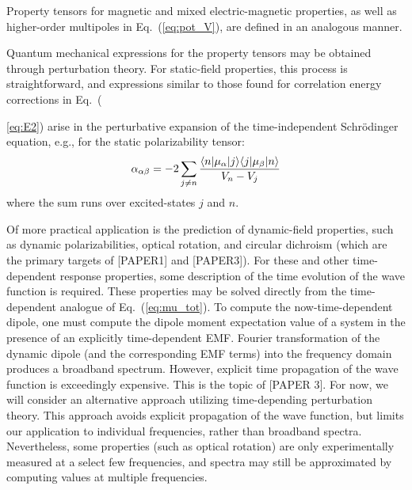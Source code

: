 Property tensors for magnetic and mixed electric-magnetic properties, as well as higher-order
multipoles in Eq.~(\ref{eq:pot_V}), are defined in an 
analogous manner.\cite{Barron2004} 

Quantum mechanical expressions for the property tensors may be obtained through perturbation theory. 
For static-field properties, this process is straightforward, and expressions similar to those found for
correlation energy corrections in Eq.~({\ref{eq:E2}) arise in the perturbative expansion of the time-independent Schr\"odinger
equation, e.g., for the static polarizability tensor:
\begin{equation} \label{eq:static_pol}
\alpha_{\alpha\beta} = -2\sum_{j\neq n}\frac{\langle n |\mu_\alpha| j \rangle\langle j |\mu_\beta| n \rangle}{V_n - V_j} 
\end{equation}
where the sum runs over excited-states $j$ and $n$.

Of more practical application is the prediction of dynamic-field properties, such as dynamic polarizabilities, 
optical rotation, and circular dichroism (which are the primary targets of [PAPER1] and [PAPER3]).
For these and other time-dependent response properties, some description of the time evolution of the wave function is
required. 
These properties may be solved directly from the time-dependent analogue of Eq.~(\ref{eq:mu_tot}). 
To compute the now-time-dependent dipole, one must compute the dipole moment expectation value of a system 
in the presence of an explicitly time-dependent EMF.
Fourier transformation of the dynamic dipole (and the corresponding EMF terms) 
into the frequency domain produces a broadband spectrum.
However, explicit time propagation of the wave function is exceedingly expensive.\cite{Goings2018} 
This is the topic of [PAPER 3]. 
For now, we will consider an alternative approach utilizing time-depending perturbation 
theory. This approach avoids explicit propagation of the wave function, but limits our
application to individual frequencies, rather than broadband spectra. Nevertheless, 
some properties (such as optical rotation) are only experimentally measured at a select few
frequencies, and spectra may still be approximated by computing values at 
multiple frequencies. 

}
